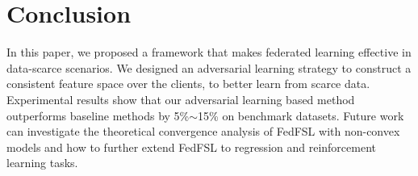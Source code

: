 \section{Conclusion}
In this paper, we proposed a framework that makes federated learning effective in data-scarce scenarios. 
We designed an adversarial learning strategy to 
construct a consistent feature space over the clients, to better learn from scarce data.
Experimental results show that our adversarial learning based method outperforms baseline methods by 5\%$\sim$15\% on benchmark datasets.
Future work can investigate the
theoretical convergence analysis of FedFSL with non-convex models and how to further extend FedFSL to regression and reinforcement learning tasks.












